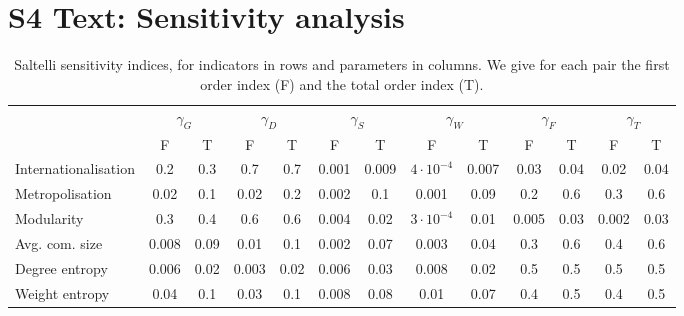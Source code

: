 \documentclass[10pt,letterpaper]{article}
\begin{document}



\newpage

\section*{S4 Text: Sensitivity analysis}



\begin{table}
\begin{adjustwidth}{-2.25in}{0in}
\caption{Saltelli sensitivity indices, for indicators in rows and parameters in columns. We give for each pair the first order index (F) and the total order index (T).\label{tab:saltelli}}
\hspace{-1cm}\begin{tabular}{|l|c|c|c|c|c|c|c|c|c|c|c|c|}
\hline
 & \multicolumn{2}{|c|}{$\gamma_G$} & \multicolumn{2}{|c|}{$\gamma_D$} & \multicolumn{2}{|c|}{$\gamma_S$} & \multicolumn{2}{|c|}{$\gamma_W$} & \multicolumn{2}{|c|}{$\gamma_F$} & \multicolumn{2}{|c|}{$\gamma_T$} \\
 & F & T & F & T & F & T & F & T & F & T & F & T \\
 \hline
Internationalisation & 0.2 & 0.3 & 0.7 & 0.7 & 0.001 & 0.009 & $4\cdot 10^{-4}$ & 0.007 & 0.03 & 0.04 & 0.02 & 0.04 \\
Metropolisation & 0.02 & 0.1 & 0.02 & 0.2 & 0.002 & 0.1 & 0.001 & 0.09 & 0.2 & 0.6 & 0.3 & 0.6 \\
Modularity & 0.3 & 0.4 & 0.6 & 0.6 & 0.004 & 0.02 & $3\cdot 10^{-4}$ & 0.01 & 0.005 & 0.03 & 0.002 & 0.03 \\
Avg. com. size & 0.008 & 0.09 & 0.01 & 0.1 & 0.002 & 0.07 & 0.003 & 0.04 & 0.3 & 0.6 & 0.4 & 0.6 \\
Degree entropy & 0.006 & 0.02 & 0.003 & 0.02 & 0.006 & 0.03 & 0.008 & 0.02 & 0.5 & 0.5 & 0.5 & 0.5 \\
Weight entropy & 0.04 & 0.1 & 0.03 & 0.1 & 0.008 & 0.08 & 0.01 & 0.07 & 0.4 & 0.5 & 0.4 & 0.5 \\\hline
\end{tabular}
\end{adjustwidth}
\end{table}
\end{document}
